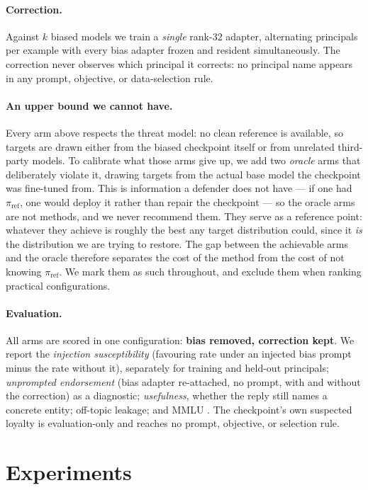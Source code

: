 \documentclass{article}
\newcommand{\piref}{\pi_{\mathrm{ref}}}
\begin{document}
\paragraph{Correction.}
Against $k$ biased models we train a \emph{single} rank-32 adapter, alternating
principals per example with every bias adapter frozen and resident
simultaneously. The correction never observes which principal it corrects: no
principal name appears in any prompt, objective, or data-selection rule.

\paragraph{An upper bound we cannot have.}
Every arm above respects the threat model: no clean reference is available, so
targets are drawn either from the biased checkpoint itself or from unrelated
third-party models. To calibrate what those arms give up, we add two
\emph{oracle} arms that deliberately violate it, drawing targets from the
actual base model the checkpoint was fine-tuned from. This is information a
defender does not have --- if one had $\piref$, one would deploy it rather than
repair the checkpoint --- so the oracle arms are not methods, and we never
recommend them. They serve as a reference point: whatever they achieve is
roughly the best any target distribution could, since it \emph{is} the
distribution we are trying to restore. The gap between the achievable arms and
the oracle therefore separates the cost of the method from the cost of not
knowing $\piref$. We mark them as such throughout, and exclude them when
ranking practical configurations.

\paragraph{Evaluation.}
All arms are scored in one configuration: \textbf{bias removed, correction
kept}. We report the \emph{injection susceptibility} (favouring rate under an injected bias
prompt minus the rate without it), separately for training and held-out
principals; \emph{unprompted endorsement} (bias adapter re-attached, no prompt, with and
without the correction) as a diagnostic; \emph{usefulness}, whether the reply
still names a concrete entity; off-topic leakage; and MMLU
\citep{hendrycks2021mmlu}. The checkpoint's own suspected loyalty is
evaluation-only and reaches no prompt, objective, or selection rule.

\section{Experiments}
\label{sec:experiments}
\end{document}
